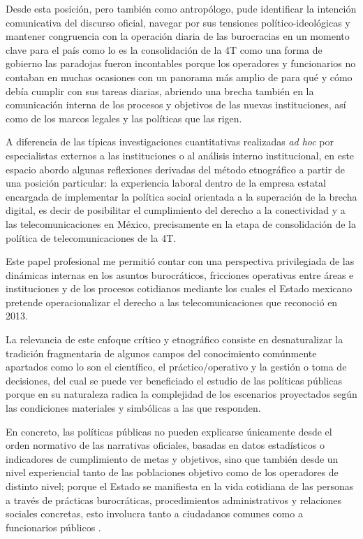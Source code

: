\documentclass[
  spanish,
  11pt,
  a4paper,
]{scrbook}
\begin{document}
Desde esta posición, pero también como antropólogo, pude identificar la
intención comunicativa del discurso oficial, navegar por sus tensiones
político-ideológicas y mantener congruencia con la operación diaria de
las burocracias en un momento clave para el país como lo es la
consolidación de la 4T como una forma de gobierno las paradojas fueron
incontables porque los operadores y funcionarios no contaban en muchas
ocasiones con un panorama más amplio de para qué y cómo debía cumplir
con sus tareas diarias, abriendo una brecha también en la comunicación
interna de los procesos y objetivos de las nuevas instituciones, así
como de los marcos legales y las políticas que las rigen.

A diferencia de las típicas investigaciones cuantitativas realizadas
\emph{ad hoc} por especialistas externos a las instituciones o al
análisis interno institucional, en este espacio abordo algunas
reflexiones derivadas del método etnográfico a partir de una posición
particular: la experiencia laboral dentro de la empresa estatal
encargada de implementar la política social orientada a la superación de
la brecha digital, es decir de posibilitar el cumplimiento del derecho a
la conectividad y a las telecomunicaciones en México, precisamente en la
etapa de consolidación de la política de telecomunicaciones de la 4T.

Este papel profesional me permitió contar con una perspectiva
privilegiada de las dinámicas internas en los asuntos burocráticos,
fricciones operativas entre áreas e instituciones y de los procesos
cotidianos mediante los cuales el Estado mexicano pretende
operacionalizar el derecho a las telecomunicaciones que reconoció en
2013.

La relevancia de este enfoque crítico y etnográfico consiste en
desnaturalizar la tradición fragmentaria de algunos campos del
conocimiento comúnmente apartados como lo son el científico, el
práctico/operativo y la gestión o toma de decisiones, del cual se puede
ver beneficiado el estudio de las políticas públicas porque en su
naturaleza radica la complejidad de los escenarios proyectados según las
condiciones materiales y simbólicas a las que responden.

En concreto, las políticas públicas no pueden explicarse únicamente
desde el orden normativo de las narrativas oficiales, basadas en datos
estadísticos o indicadores de cumplimiento de metas y objetivos, sino
que también desde un nivel experiencial tanto de las poblaciones
objetivo como de los operadores de distinto nivel; porque el Estado se
manifiesta en la vida cotidiana de las personas a través de prácticas
burocráticas, procedimientos administrativos y relaciones sociales
concretas, esto involucra tanto a ciudadanos comunes como a funcionarios
públicos \autocite{Gupta2012}.
\end{document}
